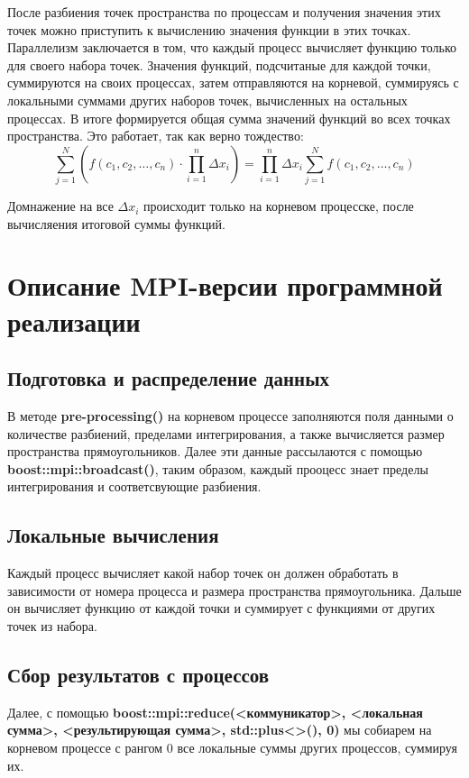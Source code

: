 \documentclass[12pt]{article}
\begin{document}
После разбиения точек пространства по процессам и получения значения этих точек можно приступить к вычислению значения функции в этих точках. Параллелизм заключается в том, что каждый процесс вычисляет функцию только для своего набора точек. Значения функций, подсчитаные для каждой точки, суммируются на своих процессах, затем  отправляются на корневой, суммируясь с локальными суммами других наборов точек, вычисленных на остальных процессах.  В итоге формируется общая сумма значений функций во всех точках пространства. Это работает,  так как верно тождество: 
    \[
     \sum_{j=1}^{N}( f(c_1, c_2, \ldots, c_n) \cdot \prod_{i=1}^{n} \Delta x_i) = \prod_{i=1}^{n} \Delta x_i\sum_{j=1}^{N} f(c_1, c_2, \ldots, c_n)
    \]

Домнажение на все $\Delta x_i$ происходит только на корневом процесске, после вычисляения итоговой суммы функций.

\section{Описание MPI-версии программной реализации}
\subsection*{Подготовка и распределение данных}
В методе \textbf{pre-processing()} на корневом процессе заполняются поля данными о количестве разбиений, пределами интегрирования, а также вычисляется размер пространства прямоугольников. Далее эти данные рассылаются с помощью \textbf{boost::mpi::broadcast()}, таким образом, каждый прооцесс знает пределы интегрирования и соответсвующие разбиения.

\subsection*{Локальные вычисления}
Каждый процесс вычисляет какой набор точек он должен обработать в зависимости от номера процесса и размера пространства прямоугольника. Дальше он вычисляет функцию от каждой точки  и суммирует с функциями от других точек из набора. 

\subsection*{Сбор результатов с процессов}
Далее, с помощью \textbf{  boost::mpi::reduce(<коммуникатор>, <локальная сумма>, <результирующая сумма>, std::plus<>(), 0)}  мы собиарем на корневом процессе с рангом 0 все локальные суммы других процессов, суммируя их.
\end{document}

